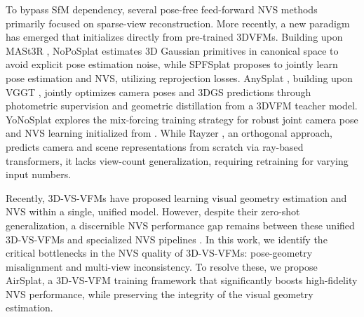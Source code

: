 To bypass SfM dependency, several pose-free feed-forward NVS methods \cite{smart2024splatt3r, hong2023unifying, kang2025selfsplat, zhang2025flarefeedforwardgeometryappearance} primarily focused on sparse-view reconstruction. 
More recently, a new paradigm has emerged that initializes directly from pre-trained 3DVFMs. 
Building upon MASt3R \cite{mast3r_eccv24}, NoPoSplat \cite{ye2024no} estimates 3D Gaussian primitives in canonical space to avoid explicit pose estimation noise, while SPFSplat \cite{huang2025no} proposes to jointly learn pose estimation and NVS, utilizing reprojection losses. 
AnySplat \cite{jiang2025anysplat}, building upon VGGT \cite{wang2025vggt}, jointly optimizes camera poses and 3DGS predictions through photometric supervision and geometric distillation from a 3DVFM teacher model. YoNoSplat \cite{ye2026yonosplat} explores the mix-forcing training strategy for robust joint camera pose and NVS learning initialized from \cite{wang2025pi3}.
While Rayzer \cite{jiang2025rayzer}, an orthogonal approach, predicts camera and scene representations from scratch via ray-based transformers, it lacks view-count generalization, requiring retraining for varying input numbers.

Recently, 3D-VS-VFMs\cite{liu2025worldmirror, lin2025da3} have proposed learning visual geometry estimation and NVS within a single, unified model. 
However, despite their zero-shot generalization, a discernible NVS performance gap remains between these unified 3D-VS-VFMs and specialized NVS pipelines \cite{ye2026yonosplat, huang2025no}. 
In this work, we identify the critical bottlenecks in the NVS quality of 3D-VS-VFMs: pose-geometry misalignment and multi-view inconsistency. 
To resolve these, we propose AirSplat, a 3D-VS-VFM training framework that significantly boosts high-fidelity NVS performance, while preserving the integrity of the visual geometry estimation.


